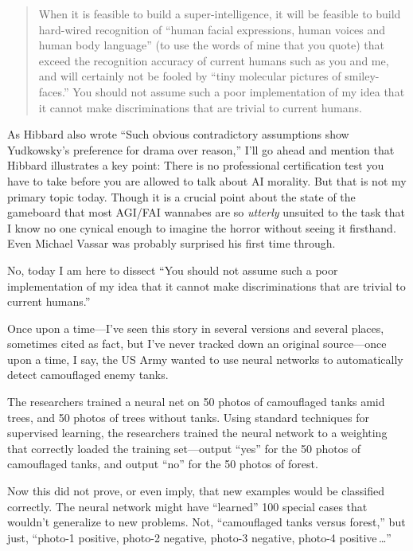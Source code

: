 \begin{quote}
{
 When it is feasible to build a super-intelligence, it will be
feasible to build hard-wired recognition of ``human
facial expressions, human voices and human body
language'' (to use the words of mine that you quote)
that exceed the recognition accuracy of current humans such as you and
me, and will certainly not be fooled by ``tiny
molecular pictures of smiley-faces.'' You should not
assume such a poor implementation of my idea that it cannot make
discriminations that are trivial to current humans.}
\end{quote}


 As Hibbard also wrote ``Such obvious
contradictory assumptions show Yudkowsky's preference
for drama over reason,'' I'll go
ahead and mention that Hibbard illustrates a key point: There is no
professional certification test you have to take before you are allowed
to talk about AI morality. But that is not my primary topic today.
Though it is a crucial point about the state of the gameboard that most
AGI/FAI wannabes are so \textit{utterly} unsuited to the task that I
know no one cynical enough to imagine the horror without seeing it
firsthand. Even Michael Vassar was probably surprised his first time
through.


 No, today I am here to dissect ``You should not
assume such a poor implementation of my idea that it cannot make
discriminations that are trivial to current
humans.''


 Once upon a time---I've seen this story in several
versions and several places, sometimes cited as fact, but
I've never tracked down an original source---once upon
a time, I say, the US Army wanted to use neural networks to
automatically detect camouflaged enemy tanks.


 The researchers trained a neural net on 50 photos of camouflaged
tanks amid trees, and 50 photos of trees without tanks. Using standard
techniques for supervised learning, the researchers trained the neural
network to a weighting that correctly loaded the training set---output
``yes'' for the 50 photos of
camouflaged tanks, and output ``no''
for the 50 photos of forest.


 Now this did not prove, or even imply, that new examples would be
classified correctly. The neural network might have
``learned'' 100 special cases that
wouldn't generalize to new problems. Not,
``camouflaged tanks versus forest,''
but just, ``photo-1 positive, photo-2 negative,
photo-3 negative, photo-4 positive\,\ldots''


